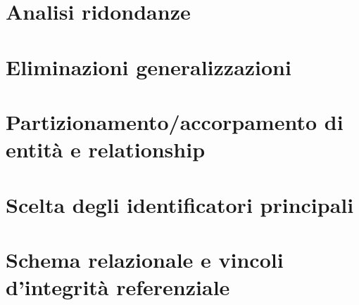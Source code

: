 \section{Analisi ridondanze}
	
	
\section{Eliminazioni generalizzazioni}


\section{Partizionamento/accorpamento di entità e relationship}


\section{Scelta degli identificatori principali}


\section{Schema relazionale e vincoli d'integrità referenziale}
